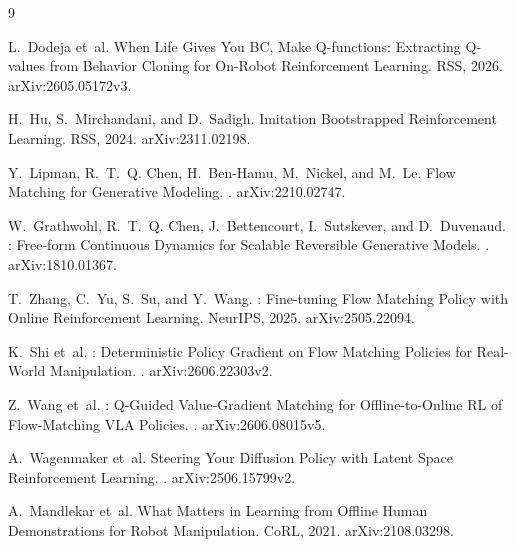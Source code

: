 \documentclass[10pt]{article}
\begin{document}
\begin{thebibliography}{9}\small
\setlength{\itemsep}{0pt}

L.~Dodeja et~al.
\newblock When Life Gives You {BC}, Make {Q}-functions: Extracting {Q}-values
  from Behavior Cloning for On-Robot Reinforcement Learning.
\newblock RSS, 2026. arXiv:2605.05172v3.

H.~Hu, S.~Mirchandani, and D.~Sadigh.
\newblock Imitation Bootstrapped Reinforcement Learning.
\newblock RSS, 2024. arXiv:2311.02198.

Y.~Lipman, R.~T.~Q. Chen, H.~Ben-Hamu, M.~Nickel, and M.~Le.
\newblock Flow Matching for Generative Modeling.
. arXiv:2210.02747.

W.~Grathwohl, R.~T.~Q. Chen, J.~Bettencourt, I.~Sutskever, and D.~Duvenaud.
: Free-form Continuous Dynamics for Scalable Reversible
  Generative Models.
. arXiv:1810.01367.

T.~Zhang, C.~Yu, S.~Su, and Y.~Wang.
: Fine-tuning Flow Matching Policy with Online
  Reinforcement Learning.
\newblock NeurIPS, 2025. arXiv:2505.22094.

K.~Shi et~al.
: Deterministic Policy Gradient on Flow Matching Policies
  for Real-World Manipulation.
. arXiv:2606.22303v2.

Z.~Wang et~al.
: {Q}-Guided Value-Gradient Matching for Offline-to-Online
  {RL} of Flow-Matching {VLA} Policies.
. arXiv:2606.08015v5.

A.~Wagenmaker et~al.
\newblock Steering Your Diffusion Policy with Latent Space Reinforcement
  Learning.
. arXiv:2506.15799v2.

A.~Mandlekar et~al.
\newblock What Matters in Learning from Offline Human Demonstrations for Robot
  Manipulation.
\newblock CoRL, 2021. arXiv:2108.03298.

\end{thebibliography}
\end{document}
